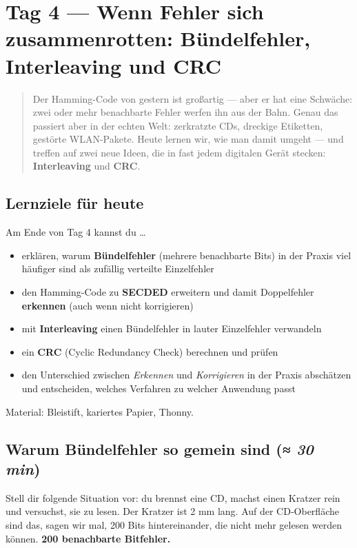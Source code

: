 \chapter{Tag 4 — Wenn Fehler sich zusammenrotten: Bündelfehler, Interleaving und CRC}

\begin{quote}
Der Hamming-Code von gestern ist großartig — aber er hat eine Schwäche:
zwei oder mehr benachbarte Fehler werfen ihn aus der Bahn. Genau das
passiert aber in der echten Welt: zerkratzte CDs, dreckige Etiketten,
gestörte WLAN-Pakete. Heute lernen wir, wie man damit umgeht — und
treffen auf zwei neue Ideen, die in fast jedem digitalen Gerät
stecken: \textbf{Interleaving} und \textbf{CRC}.
\end{quote}

\section*{Lernziele für heute}

Am Ende von Tag 4 kannst du \dots

\begin{itemize}
\item erklären, warum \textbf{Bündelfehler} (mehrere benachbarte Bits)
  in der Praxis viel häufiger sind als zufällig verteilte Einzelfehler
\item den Hamming-Code zu \textbf{SECDED} erweitern und damit
  Doppelfehler \textbf{erkennen} (auch wenn nicht korrigieren)
\item mit \textbf{Interleaving} einen Bündelfehler in lauter
  Einzelfehler verwandeln
\item ein \textbf{CRC} (Cyclic Redundancy Check) berechnen und prüfen
\item den Unterschied zwischen \emph{Erkennen} und \emph{Korrigieren}
  in der Praxis abschätzen und entscheiden, welches Verfahren zu
  welcher Anwendung passt
\end{itemize}

Material: Bleistift, kariertes Papier, Thonny.

\section{Warum Bündelfehler so gemein sind \normalfont(\textit{≈ 30 min})}

Stell dir folgende Situation vor: du brennst eine CD, machst einen
Kratzer rein und versuchst, sie zu lesen. Der Kratzer ist 2 mm lang.
Auf der CD-Oberfläche sind das, sagen wir mal, 200 Bits hintereinander,
die nicht mehr gelesen werden können. \textbf{200 benachbarte
Bitfehler.}

